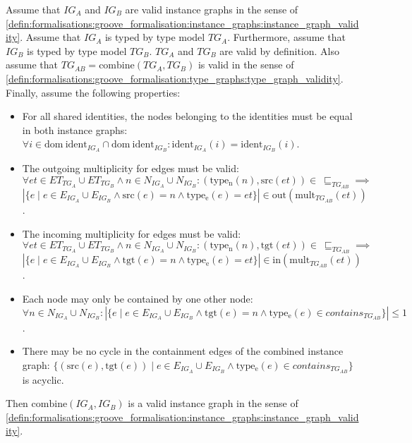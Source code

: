 \begin{thm}
\label{defin:transformation_framework:instance_models_and_instance_graphs:combining_instance_graphs:ig_combine_correct}
Assume that $IG_A$ and $IG_B$ are valid instance graphs in the sense of \cref{defin:formalisations:groove_formalisation:instance_graphs:instance_graph_validity}. Assume that $IG_A$ is typed by type model $TG_A$. Furthermore, assume that $IG_B$ is typed by type model $TG_B$. $TG_A$ and $TG_B$ are valid by definition. Also assume that $TG_{AB} = \mathrm{combine}(TG_A, TG_B)$ is valid in the sense of \cref{defin:formalisations:groove_formalisation:type_graphs:type_graph_validity}. Finally, assume the following properties:
\begin{itemize}
    \item For all shared identities, the nodes belonging to the identities must be equal in both instance graphs: $\forall i \in \mathrm{dom}\ \mathrm{ident}_{IG_A} \cap \mathrm{dom}\ \mathrm{ident}_{IG_B}\!: \mathrm{ident}_{IG_A}(i) = \mathrm{ident}_{IG_B}(i)$.
    \item The outgoing multiplicity for edges must be valid: $\forall et \in ET_{TG_A} \cup ET_{TG_B} \land n \in N_{IG_A} \cup N_{IG_B}\!: (\mathrm{type_n}(n), \mathrm{src}(et)) \in\ \sqsubseteq_{TG_{AB}} \implies$\\$|\{e \mid e \in E_{IG_A} \cup E_{IG_B} \land \mathrm{src}(e) = n \land \mathrm{type_e}(e) = et \}| \in \mathrm{out}(\mathrm{mult}_{TG_{AB}}(et))$.
    \item The incoming multiplicity for edges must be valid: $\forall et \in ET_{TG_A} \cup ET_{TG_B} \land n \in N_{IG_A} \cup N_{IG_B}\!: (\mathrm{type_n}(n), \mathrm{tgt}(et)) \in\ \sqsubseteq_{TG_{AB}} \implies$\\$|\{e \mid e \in E_{IG_A} \cup E_{IG_B} \land \mathrm{tgt}(e) = n \land \mathrm{type_e}(e) = et \}| \in \mathrm{in}(\mathrm{mult}_{TG_{AB}}(et))$.
    \item Each node may only be contained by one other node: $\forall n \in N_{IG_A} \cup N_{IG_B}\!: |\{e \mid e \in E_{IG_A} \cup E_{IG_B} \land \mathrm{tgt}(e) = n \land \mathrm{type_e}(e) \in contains_{TG_{AB}} \}| \leq 1$.
    \item There may be no cycle in the containment edges of the combined instance graph: $\{( \mathrm{src}(e), \mathrm{tgt}(e) ) \mid e \in E_{IG_A} \cup E_{IG_B} \land \mathrm{type_e}(e) \in contains_{TG_{AB}} \}$ is acyclic.
\end{itemize}

Then $\mathrm{combine}(IG_A, IG_B)$ is a valid instance graph in the sense of \cref{defin:formalisations:groove_formalisation:instance_graphs:instance_graph_validity}.
\end{thm}

